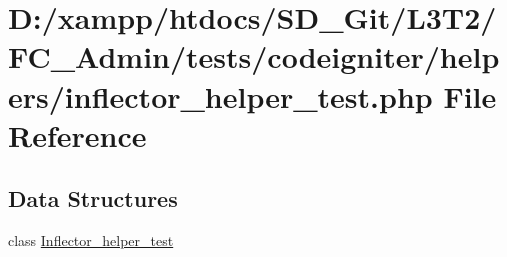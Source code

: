 \hypertarget{_admin_2tests_2codeigniter_2helpers_2inflector__helper__test_8php}{}\section{D\+:/xampp/htdocs/\+S\+D\+\_\+\+Git/\+L3\+T2/\+F\+C\+\_\+\+Admin/tests/codeigniter/helpers/inflector\+\_\+helper\+\_\+test.php File Reference}
\label{_admin_2tests_2codeigniter_2helpers_2inflector__helper__test_8php}
\subsection*{Data Structures}
\begin{DoxyCompactItemize}
\item 
class \hyperlink{class_inflector__helper__test}{Inflector\+\_\+helper\+\_\+test}
\end{DoxyCompactItemize}
